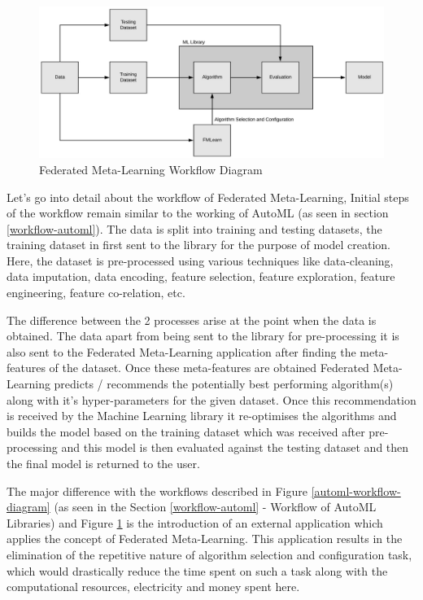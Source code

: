 \begin{figure}[t]
    \centering
    \includegraphics[width=15cm]{images/FML Workflow.jpeg}
    \caption{Federated Meta-Learning Workflow Diagram}
    \label{fml-workflow-diagram}
\end{figure}

Let's go into detail about the workflow of Federated Meta-Learning, Initial steps of the workflow remain similar to the working of AutoML (as seen in section \ref{workflow-automl}). The data is split into training and testing datasets, the training dataset in first sent to the library for the purpose of model creation. Here, the dataset is pre-processed using various techniques like data-cleaning, data imputation, data encoding, feature selection, feature exploration, feature engineering, feature co-relation, etc.

The difference between the 2 processes arise at the point when the data is obtained. The data apart from being sent to the library for pre-processing it is also sent to the Federated Meta-Learning application after finding the meta-features of the dataset. Once these meta-features are obtained Federated Meta-Learning predicts / recommends the potentially best performing algorithm(s) along with it's hyper-parameters for the given dataset. Once this recommendation is received by the Machine Learning library it re-optimises the algorithms and builds the model based on the training dataset which was received after pre-processing and this model is then evaluated against the testing dataset and then the final model is returned to the user.

The major difference with the workflows described in Figure \ref{automl-workflow-diagram} (as seen in the Section \ref{workflow-automl} - Workflow of AutoML Libraries) and Figure \ref{fml-workflow-diagram} is the introduction of an external application which applies the concept of Federated Meta-Learning. This application results in the elimination of the repetitive nature of algorithm selection and configuration task, which would drastically reduce the time spent on such a task along with the computational resources, electricity and money spent here.

